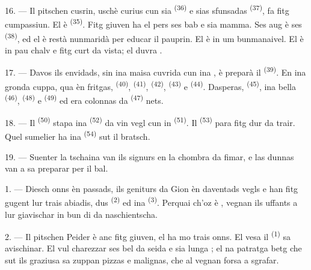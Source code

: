 16. --- Il pitschen cusrin, uschè curius cun sia  \textsuperscript{(36)}
e sias sfunsadas  \textsuperscript{(37)}, fa fitg
cumpassiun. El è  \textsuperscript{(35)}. Fitg giuven ha el pers ses
bab e sia mamma. Ses aug è ses  \textsuperscript{(38)}, ed el è restà
nunmaridà per educar il pauprin. El è in um bunmanaivel. El è in pau chalv e fitg
curt da vista; el duvra .

\VUsaut{2.4mm}
\VUsaut{3.0mm}

17. --- Davos ils envidads, sin ina maisa cuvrida cun ina , è
preparà il  \textsuperscript{(39)}. En ina gronda cuppa, qua èn
fritgas,  \textsuperscript{(40)},  \textsuperscript{(41)},
 \textsuperscript{(42)},  \textsuperscript{(43)} e
 \textsuperscript{(44)}. Dasperas, 
\textsuperscript{(45)}, ina bella  \textsuperscript{(46)},
 \textsuperscript{(48)} e 
\textsuperscript{(49)} ed era colonnas da  \textsuperscript{(47)} nets.

18. --- Il  \textsuperscript{(50)} stapa ina 
\textsuperscript{(52)} da vin vegl cun in  \textsuperscript{(51)}. Il
 \textsuperscript{(53)} para fitg dur da trair. Quel sumelier ha
ina  \textsuperscript{(54)} sut il bratsch.

19. --- Suenter la tschaina van ils signurs en la chombra da fimar, e las dunnas
van a sa preparar per il bal.

\VUsaut{5.0mm}
\VUsaut{1.6mm}
\VUsaut{2.6mm}

\VUsaut{3.0mm}

1. --- Diesch onns èn passads, ils geniturs da Gion èn daventads vegls e han fitg
gugent lur trais abiadis, dus  \textsuperscript{(2)} ed ina
 \textsuperscript{(3)}. Perquai ch'oz è , vegnan ils uffants a lur giavischar in bun di da naschientscha.

2. --- Il pitschen Peider è anc fitg giuven, el ha mo trais onns. El vesa il
 \textsuperscript{(1)} sa avischinar. El vul charezzar ses bel
 da seida e sia lunga ; el na patratga betg che sut ils
graziusa  sa zuppan  pizzas e malignas, che al vegnan
forsa a sgrafar.

